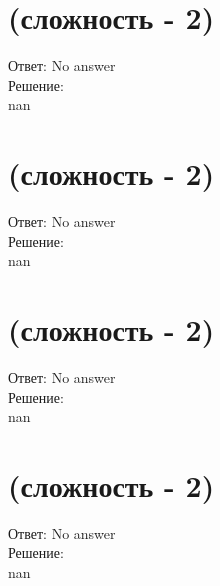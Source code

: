 \documentclass{article}%
\begin{document}
%
\section{(сложность {-} 2)}%
\label{sec:( {-} 2)}%
\hspace{3ex} Ответ: No answer \\%
%
\hspace*{3ex} Решение: \\%
nan

%
\section{(сложность {-} 2)}%
\label{sec:( {-} 2)}%
\hspace{3ex} Ответ: No answer \\%
%
\hspace*{3ex} Решение: \\%
nan

%
\section{(сложность {-} 2)}%
\label{sec:( {-} 2)}%
\hspace{3ex} Ответ: No answer \\%
%
\hspace*{3ex} Решение: \\%
nan

%
\section{(сложность {-} 2)}%
\label{sec:( {-} 2)}%
\hspace{3ex} Ответ: No answer \\%
%
\hspace*{3ex} Решение: \\%
nan

%
\end{document}
